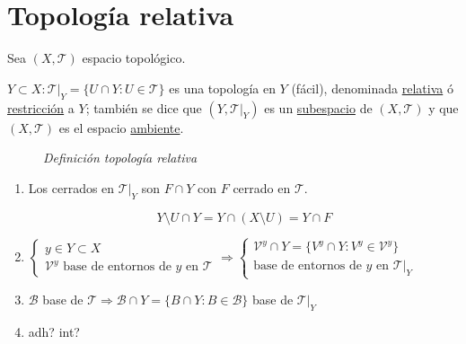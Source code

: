 \section{Topología relativa}%
\label{sec:topologia_relativa}
Sea $\left( X, \mathcal{T} \right)$ espacio topológico.
\begin{defi}
$Y \subset X: \mathcal{T}|_Y = \{U \cap Y: U \in \mathcal{T}\}$ es una topología en $Y$ (fácil), denominada \underline{relativa} ó \underline{restricción} a $Y$; también se dice que $\left( Y, \mathcal{T}|_Y \right)$ es un \underline{subespacio} de $\left( X, \mathcal{T} \right)$ y que $\left( X, \mathcal{T} \right)$ es el espacio \underline{ambiente}. 
\end{defi}

\begin{figure}[H]
    \centering
    \caption{\textit{Definición topología relativa}}
    \label{fig:definición-topología-relativa}
\end{figure}

\begin{obs}
\begin{enumerate}
    \item Los cerrados en $\mathcal{T}|_Y$ son $F\cap Y$ con $F$ cerrado en $\mathcal{T}$.
    \begin{demo}
    \[
    Y \setminus U \cap Y = Y \cap \left( X \setminus U \right) = Y\cap F
    \]
    \end{demo}
    \item 
    $\begin{cases}
        y \in Y \subset X\\
        \mathcal{V}^y \text{ base de entornos de } y \text{ en } \mathcal{T} 
    \end{cases}\Rightarrow \begin{cases}
        \mathcal{V}^y \cap Y = \{V^y \cap Y : V^y \in \mathcal{V}^y\} \\
        \text{base de entornos de } y \text{ en } \mathcal{T}|_Y 
    \end{cases}$

    \item $\mathcal{B}$ base de $\mathcal{T} \Rightarrow \mathcal{B} \cap Y = \{B \cap Y : B \in \mathcal{B}\}$ base de $\mathcal{T}|_Y$

    \item adh? int?
\end{enumerate}
\end{obs}

